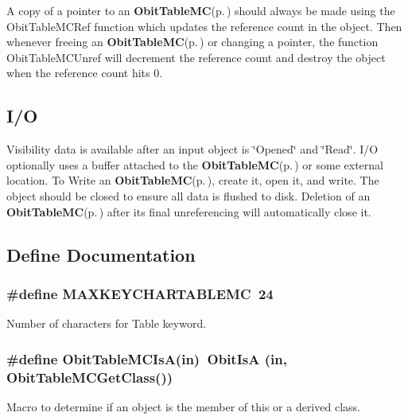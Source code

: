 A copy of a pointer to an {\bf Obit\-Table\-MC}{\rm (p.\,\pageref{structObitTableMC})} should always be made using the Obit\-Table\-MCRef function which updates the reference count in the object. Then whenever freeing an {\bf Obit\-Table\-MC}{\rm (p.\,\pageref{structObitTableMC})} or changing a pointer, the function Obit\-Table\-MCUnref will decrement the reference count and destroy the object when the reference count hits 0.\subsection{I/O}\label{ObitTableMC_8h_ObitTableMCUsage}
Visibility data is available after an input object is \char`\"{}Opened\char`\"{} and \char`\"{}Read\char`\"{}. I/O optionally uses a buffer attached to the {\bf Obit\-Table\-MC}{\rm (p.\,\pageref{structObitTableMC})} or some external location. To Write an {\bf Obit\-Table\-MC}{\rm (p.\,\pageref{structObitTableMC})}, create it, open it, and write. The object should be closed to ensure all data is flushed to disk. Deletion of an {\bf Obit\-Table\-MC}{\rm (p.\,\pageref{structObitTableMC})} after its final unreferencing will automatically close it.

\subsection{Define Documentation}
\subsubsection{\setlength{\rightskip}{0pt plus 5cm}\#define MAXKEYCHARTABLEMC\ 24}\label{ObitTableMC_8h_a0}


Number of characters for Table keyword. 

\subsubsection{\setlength{\rightskip}{0pt plus 5cm}\#define Obit\-Table\-MCIs\-A(in)\ Obit\-Is\-A (in, Obit\-Table\-MCGet\-Class())}\label{ObitTableMC_8h_a3}


Macro to determine if an object is the member of this or a derived class. 

